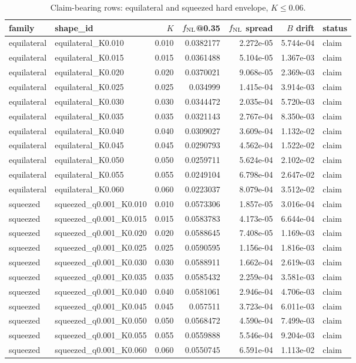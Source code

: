 \begin{table}[htbp]
\centering
\caption{Claim-bearing rows: equilateral and squeezed hard envelope, $K \leq 0.06$.}
\label{tab:claims}
\begin{tabular}{llrrrrl}
\hline
family & shape\_id & $K$ & $f_{\rm NL}$@0.35 & $f_{\rm NL}$ spread & $B$ drift & status \\
\hline
equilateral & equilateral\_K0.010 & 0.010 & 0.0382177 & 2.272e-05 & 5.744e-04 & claim \\
equilateral & equilateral\_K0.015 & 0.015 & 0.0361488 & 5.104e-05 & 1.367e-03 & claim \\
equilateral & equilateral\_K0.020 & 0.020 & 0.0370021 & 9.068e-05 & 2.369e-03 & claim \\
equilateral & equilateral\_K0.025 & 0.025 & 0.034999 & 1.415e-04 & 3.914e-03 & claim \\
equilateral & equilateral\_K0.030 & 0.030 & 0.0344472 & 2.035e-04 & 5.720e-03 & claim \\
equilateral & equilateral\_K0.035 & 0.035 & 0.0321143 & 2.767e-04 & 8.350e-03 & claim \\
equilateral & equilateral\_K0.040 & 0.040 & 0.0309027 & 3.609e-04 & 1.132e-02 & claim \\
equilateral & equilateral\_K0.045 & 0.045 & 0.0290793 & 4.562e-04 & 1.522e-02 & claim \\
equilateral & equilateral\_K0.050 & 0.050 & 0.0259711 & 5.624e-04 & 2.102e-02 & claim \\
equilateral & equilateral\_K0.055 & 0.055 & 0.0249104 & 6.798e-04 & 2.647e-02 & claim \\
equilateral & equilateral\_K0.060 & 0.060 & 0.0223037 & 8.079e-04 & 3.512e-02 & claim \\
squeezed & squeezed\_q0.001\_K0.010 & 0.010 & 0.0573306 & 1.857e-05 & 3.016e-04 & claim \\
squeezed & squeezed\_q0.001\_K0.015 & 0.015 & 0.0583783 & 4.173e-05 & 6.644e-04 & claim \\
squeezed & squeezed\_q0.001\_K0.020 & 0.020 & 0.0588645 & 7.408e-05 & 1.169e-03 & claim \\
squeezed & squeezed\_q0.001\_K0.025 & 0.025 & 0.0590595 & 1.156e-04 & 1.816e-03 & claim \\
squeezed & squeezed\_q0.001\_K0.030 & 0.030 & 0.0588911 & 1.662e-04 & 2.619e-03 & claim \\
squeezed & squeezed\_q0.001\_K0.035 & 0.035 & 0.0585432 & 2.259e-04 & 3.581e-03 & claim \\
squeezed & squeezed\_q0.001\_K0.040 & 0.040 & 0.0581061 & 2.946e-04 & 4.706e-03 & claim \\
squeezed & squeezed\_q0.001\_K0.045 & 0.045 & 0.057511 & 3.723e-04 & 6.011e-03 & claim \\
squeezed & squeezed\_q0.001\_K0.050 & 0.050 & 0.0568472 & 4.590e-04 & 7.499e-03 & claim \\
squeezed & squeezed\_q0.001\_K0.055 & 0.055 & 0.0559888 & 5.546e-04 & 9.204e-03 & claim \\
squeezed & squeezed\_q0.001\_K0.060 & 0.060 & 0.0550745 & 6.591e-04 & 1.113e-02 & claim \\
\hline
\end{tabular}
\end{table}
